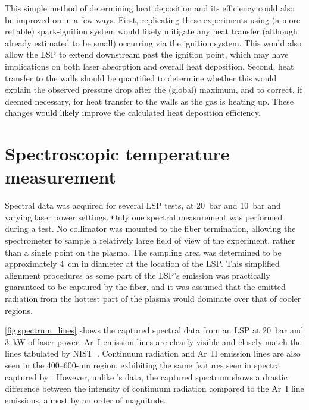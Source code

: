             This simple method of determining heat deposition and its efficiency could also be improved on in a few ways. First, replicating these experiments using (a more reliable) spark-ignition system would likely mitigate any heat transfer (although already estimated to be small) occurring via the ignition system. This would also allow the LSP to extend downstream past the ignition point, which may have implications on both laser absorption and overall heat deposition. Second, heat transfer to the walls should be quantified to determine whether this would explain the observed pressure drop after the (global) maximum, and to correct, if deemed necessary, for heat transfer to the walls as the gas is heating up. These changes would likely improve the calculated heat deposition efficiency.
    
    \clearpage
    \section{Spectroscopic temperature measurement} \label{sec:results_spectroscopy}
        Spectral data was acquired for several LSP tests, at \qty{20}{bar} and \qty{10}{bar} and varying laser power settings. Only one spectral measurement was performed during a test. No collimator was mounted to the fiber termination, allowing the spectrometer to sample a relatively large field of view of the experiment, rather than a single point on the plasma. The sampling area was determined to be approximately \qty{4}{cm} in diameter at the location of the LSP. This simplified alignment procedures as some part of the LSP's emission was practically guaranteed to be captured by the fiber, and it was assumed that the emitted radiation from the hottest part of the plasma would dominate over that of cooler regions.

        \autoref{fig:spectrum_lines} shows the captured spectral data from an LSP at \qty{20}{bar} and \qty{3}{kW} of laser power. Ar~I emission lines are clearly visible and closely match the lines tabulated by NIST~\cite{kramidaNISTAtomicSpectra2022}. Continuum radiation and Ar~II emission lines are also seen in the 400--600-nm region, exhibiting the same features seen in spectra captured by \textcite{luCharacteristicDiagnosticsLaserStabilized2022}. However, unlike \citeauthor{luCharacteristicDiagnosticsLaserStabilized2022}'s data, the captured spectrum shows a drastic difference between the intensity of continuum radiation compared to the Ar~I line emissions, almost by an order of magnitude.

